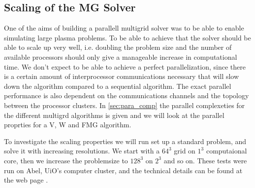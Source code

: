 \subsection{Scaling of the MG Solver}
	One of the aims of building a parallell multigrid solver was to be able
	to enable simulating large plasma problems. To be able to achieve that the solver
	should be able to scale up very well, i.e. doubling the problem size and the number
	of available processors should only give a manageable increase in computational time.
	We don't expect to be able to achieve a perfect parallelization, since there is
	a certain amount of interprocessor communications necessary that will slow down
	the algorithm compared to a sequential algorithm. The exact parallel performance
	is also dependent on the communications channels and the topology between the processor clusters.
	In \cref{sec:para_comp} the parallel
	complexeties for the different multigrd algorithms is given and we will look at
	the parallel proprties for a V, W and FMG algorithm.


	To investigate the scaling properties we will run set up a standard problem,
	and solve it with increasing resolutions. We start with a \(64^3\) grid on
 	\(1^3\) computaional core, then we increase the problemsize to \(128^3\) on \(2^3\)
	and so on. These tests were run on Abel, UiO's computer cluster, and the technical details
	can be found at the web page \citep{_more_????}.
